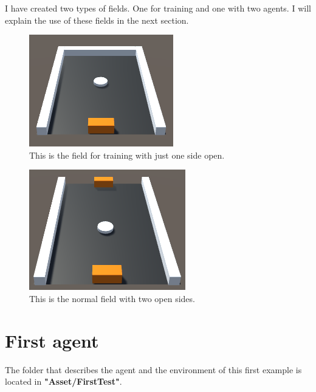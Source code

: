 \documentclass[12pt]{article}
\begin{document}
	\noindent
	I have created two types of fields. One for training and one with two agents. I will explain the use of these fields in the next section.

	\begin{figure}[hbt!]
		\centering
		\includegraphics[width= 0.70
		\textwidth]{images/TrainingField2}
		\caption{This is the field for training with just one side open.}
		\label{lbl:traningField}
	\end{figure} 
	
	\newpage
	
	\begin{figure}[hbt!]
		\centering
		\includegraphics[width= 0.70
		\textwidth]{images/AgentVsAgentField2}
		\caption{This is the normal field with two open sides.}
	\end{figure} 
	
	\newpage
	
	\section{First agent}
	The folder that describes the agent and the environment of this first example is located in \textbf{"Asset/FirstTest"}.
	
\end{document}
